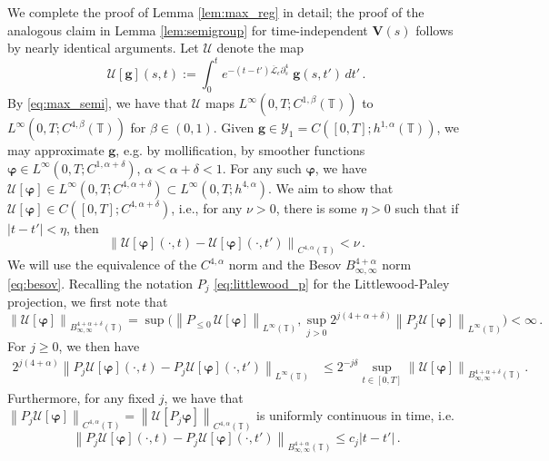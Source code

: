 \documentclass[11pt,reqno]{amsart}
\newcommand{\T}{\mathbb{T}}
\newcommand{\p}{\partial}
\newcommand{\abs}[1]{\left\lvert #1 \right\rvert}
\newcommand{\norm}[1]{\left\lVert #1 \right\rVert}
\newcommand{\mc}[1]{\mathcal{#1}}
\theoremstyle{definition}
\begin{document}
We complete the proof of Lemma \ref{lem:max_reg} in detail; the proof of the analogous claim in Lemma \ref{lem:semigroup} for time-independent $\bm{V}(s)$ follows by nearly identical arguments. Let $\mc{U}$ denote the map
\begin{equation}
\mc{U}[\bm{g}](s,t):= \int_0^t e^{-(t-t')\overline{\mc{L}}_\epsilon\p_s^4}\;\bm{g}(s,t')\,dt'\,.
\end{equation}
By \eqref{eq:max_semi}, we have that $\mc{U}$ maps $L^\infty(0,T;C^{1,\beta}(\T))$ to $L^\infty(0,T;C^{4,\beta}(\T))$ for $\beta\in(0,1)$.
%
Given $\bm{g}\in \mc{Y}_1=C([0,T];h^{1,\alpha}(\T))$, we may approximate $\bm{g}$, e.g. by mollification, by smoother functions $\bm{\varphi}\in L^\infty(0,T;C^{1,\alpha+\delta})$, $\alpha<\alpha+\delta<1$. For any such $\bm{\varphi}$, we have $\mc{U}[\bm{\varphi}]\in L^\infty(0,T;C^{4,\alpha+\delta})\subset L^\infty(0,T;h^{4,\alpha})$. We aim to show that $\mc{U}[\bm{\varphi}]\in C([0,T];C^{4,\alpha+\delta})$, i.e., for any $\nu>0$, there is some $\eta>0$ such that if $\abs{t-t'}<\eta$, then 
\begin{equation}
  \norm{\mc{U}[\bm{\varphi}](\cdot,t)-\mc{U}[\bm{\varphi}](\cdot,t')}_{C^{4,\alpha}(\T)}<\nu\,.
\end{equation}
%
We will use the equivalence of the $C^{4,\alpha}$ norm and the Besov $B^{4+\alpha}_{\infty,\infty}$ norm \eqref{eq:besov}. Recalling the notation $P_j$ \eqref{eq:littlewood_p} for the Littlewood-Paley projection, we first note that 
\begin{equation}
  \norm{\mc{U}[\bm{\varphi}]}_{B^{4+\alpha+\delta}_{\infty,\infty}(\T)}=\sup \bigg(\norm{P_{\le 0}\,\mc{U}[\bm{\varphi}]}_{L^\infty(\T)},\sup_{j>0}2^{j(4+\alpha+\delta)}\norm{P_j\mc{U}[\bm{\varphi}]}_{L^\infty(\T)}\bigg)<\infty\,.
\end{equation}
%
%
For $j\ge 0$, we then have
\begin{equation}
\begin{aligned}
  2^{j(4+\alpha)}\norm{P_j\mc{U}[\bm{\varphi}](\cdot,t)-P_j\mc{U}[\bm{\varphi}](\cdot,t')}_{L^\infty(\T)}
  &\le 2^{-j\delta}\sup_{t\in[0,T]}\norm{\mc{U}[\bm{\varphi}]}_{B^{4+\alpha+\delta}_{\infty,\infty}(\T)}\,.
\end{aligned}
\end{equation}
%
%
Furthermore, for any fixed $j$, we have that 
$\norm{P_j\mc{U}[\bm{\varphi}]}_{C^{4,\alpha}(\T)}=\norm{\mc{U}[P_j\bm{\varphi}]}_{C^{4,\alpha}(\T)}$ is uniformly continuous in time, i.e.
\begin{equation}
  \norm{P_j\mc{U}[\bm{\varphi}](\cdot,t)-P_j\mc{U}[\bm{\varphi}](\cdot,t')}_{B^{4+\alpha}_{\infty,\infty}(\T)} \le c_j\abs{t-t'}\,.
\end{equation}
\end{document}
